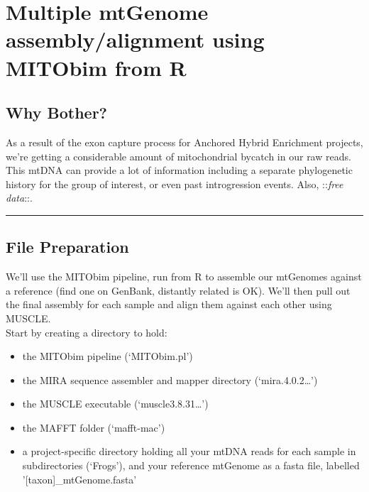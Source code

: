 \documentclass[]{article}
\providecommand{\tightlist}{%
  \setlength{\itemsep}{0pt}\setlength{\parskip}{0pt}}
\renewcommand{\linethickness}{0.05em}
\begin{document}
\pagebreak

\hypertarget{multiple-mtgenome-assemblyalignment-using-mitobim-from-r}{%
\section{Multiple mtGenome assembly/alignment using MITObim from
R}\label{multiple-mtgenome-assemblyalignment-using-mitobim-from-r}}

\hypertarget{why-bother}{%
\subsection{Why Bother?}\label{why-bother}}

As a result of the exon capture process for Anchored Hybrid Enrichment
projects, we're getting a considerable amount of mitochondrial bycatch
in our raw reads. This mtDNA can provide a lot of information including
a separate phylogenetic history for the group of interest, or even past
introgression events. Also, ::\emph{free data}::.

\begin{center}\rule{0.5\linewidth}{\linethickness}\end{center}

\hypertarget{file-preparation}{%
\subsection{File Preparation}\label{file-preparation}}

We'll use the MITObim pipeline, run from R to assemble our mtGenomes
against a reference (find one on GenBank, distantly related is OK).
We'll then pull out the final assembly for each sample and align them
against each other using MUSCLE.\\
Start by creating a directory to hold:

\begin{itemize}
\tightlist
\item
  the MITObim pipeline (`MITObim.pl')\\
\item
  the MIRA sequence assembler and mapper directory
  (`mira.4.0.2\ldots{}')\\
\item
  the MUSCLE executable (`muscle3.8.31\ldots{}')
\item
  the MAFFT folder (`mafft-mac')
\item
  a project-specific directory holding all your mtDNA reads for each
  sample in subdirectories (`Frogs'), and your reference mtGenome as a
  fasta file, labelled '{[}taxon{]}\_mtGenome.fasta'
\end{itemize}
\end{document}
